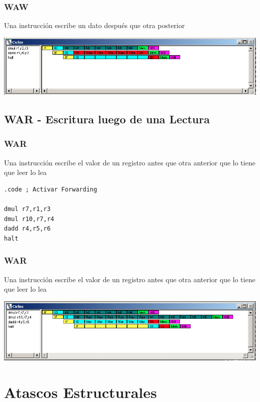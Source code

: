 \documentclass{beamer}
\begin{document}
\begin{frame}[fragile]
\frametitle{WAW}
Una instrucción escribe un dato después que otra posterior
\begin{block}{}
\includegraphics[scale=0.45]{waw.png}
\end{block}
\end{frame}

\subsection{WAR - Escritura luego de una Lectura}
\begin{frame}[fragile]
\frametitle{WAR}
Una instrucción escribe el valor de un registro antes que otra anterior que lo tiene que leer lo lea
\begin{block}{}
\begin{lstlisting}[basicstyle=\ttfamily,keywordstyle=\color{blue}]
.code ; Activar Forwarding

dmul r7,r1,r3
dmul r10,r7,r4
dadd r4,r5,r6
halt
\end{lstlisting}
\end{block}

\end{frame}


\begin{frame}[fragile]
\frametitle{WAR}
Una instrucción escribe el valor de un registro antes que otra anterior que lo tiene que leer lo lea
\begin{block}{}
\includegraphics[scale=0.45]{war.png}
\end{block}
\end{frame}



\section{Atascos Estructurales}
\end{document}
